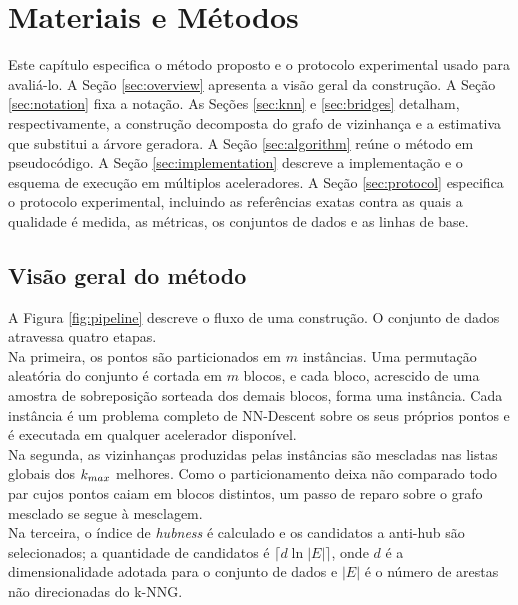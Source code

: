 
\chapter{Materiais e Métodos\label{cha:methods}}

Este capítulo especifica o método proposto e o protocolo experimental usado para avaliá-lo. A Seção \ref{sec:overview} apresenta a visão geral da construção. A Seção \ref{sec:notation} fixa a notação. As Seções \ref{sec:knn} e \ref{sec:bridges} detalham, respectivamente, a construção decomposta do grafo de vizinhança e a estimativa que substitui a árvore geradora. A Seção \ref{sec:algorithm} reúne o método em pseudocódigo. A Seção \ref{sec:implementation} descreve a implementação e o esquema de execução em múltiplos aceleradores. A Seção \ref{sec:protocol} especifica o protocolo experimental, incluindo as referências exatas contra as quais a qualidade é medida, as métricas, os conjuntos de dados e as linhas de base.

\section{Visão geral do método\label{sec:overview}}

A Figura \ref{fig:pipeline} descreve o fluxo de uma construção. O conjunto de dados atravessa quatro etapas.\\

Na primeira, os pontos são particionados em $m$ instâncias. Uma permutação aleatória do conjunto é cortada em $m$ blocos, e cada bloco, acrescido de uma amostra de sobreposição sorteada dos demais blocos, forma uma instância. Cada instância é um problema completo de NN-Descent sobre os seus próprios pontos e é executada em qualquer acelerador disponível.\\

Na segunda, as vizinhanças produzidas pelas instâncias são mescladas nas listas globais dos $k_{max}$ melhores. Como o particionamento deixa não comparado todo par cujos pontos caiam em blocos distintos, um passo de reparo sobre o grafo mesclado se segue à mesclagem.\\

Na terceira, o índice de \textit{hubness} é calculado e os candidatos a anti-hub são selecionados; a quantidade de candidatos é $\lceil d \ln |E| \rceil$, onde $d$ é a dimensionalidade adotada para o conjunto de dados e $|E|$ é o número de arestas não direcionadas do \ac{k-NNG}.\\

